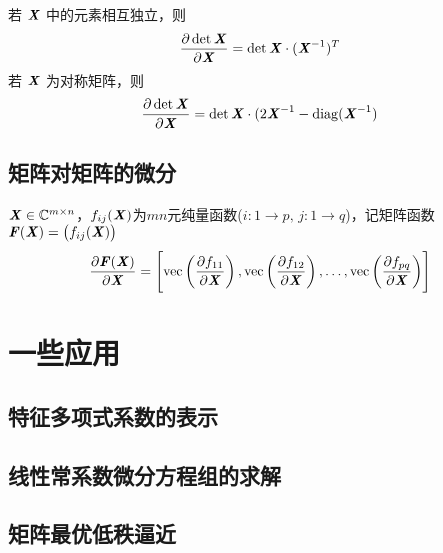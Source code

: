 \begin{theorem}
    若 $\MX$ 中的元素相互独立，则
    \[
        \frac{\partial \det \boldsymbol{\mathit{X}}}{\partial \boldsymbol{\mathit{X}}} = \det \boldsymbol{\mathit{X}} \cdot (\boldsymbol{\mathit{X}}^{-1})^T
    \]
    若 $\MX$ 为对称矩阵，则
    \[
        \frac{\partial \det \boldsymbol{\mathit{X}}}{\partial \boldsymbol{\mathit{X}}} = \det \boldsymbol{\mathit{X}} \cdot (2 \boldsymbol{\mathit{X}}^{-1} - \mathop{\mathrm{diag}}(\boldsymbol{\mathit{X}}^{-1})
    \]
\end{theorem}

\subsection{矩阵对矩阵的微分}
\label{sub:矩阵对矩阵的微分}

\begin{definition}[矩阵$\MF(\MX)$对$\MX$的微分]
    $\boldsymbol{\mathit{X}} \in \mathbb{C}^{m \times n}$，$f_{ij}(\boldsymbol{\mathit{X}})$为$mn$元纯量函数($i\colon 1 \to p,\, j\colon 1 \to q$)，记矩阵函数$\boldsymbol{\mathit{F}}(\boldsymbol{\mathit{X}}) = \left( f_{ij}(\boldsymbol{\mathit{X}}) \right)$
    \[
        \frac{\partial \boldsymbol{\mathit{F}}(\boldsymbol{\mathit{X}})}{\partial \boldsymbol{\mathit{X}}} =
        \left[
            \mathrm{vec}\left(\frac{\partial f_{11}}{\partial \boldsymbol{\mathit{X}}}  \right),
            \mathrm{vec}\left(\frac{\partial f_{12}}{\partial \boldsymbol{\mathit{X}}}  \right),
            \ldots,
            \mathrm{vec}\left(\frac{\partial f_{pq}}{\partial \boldsymbol{\mathit{X}}}  \right)  \right]
    \]
\end{definition}

\section{一些应用}
\label{sec:一些应用}


\subsection{特征多项式系数的表示}
\label{sub:特征多项式系数的表示}

\subsection{线性常系数微分方程组的求解}
\label{sub:线性常系数微分方程组的求解}

\subsection{矩阵最优低秩逼近}
\label{sub:矩阵最优低秩逼近}
